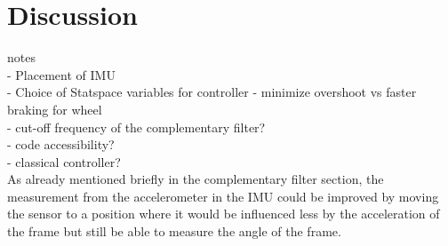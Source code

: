 \chapter{Discussion}

{\Large notes} \\
- Placement of IMU\\
- Choice of Statspace variables for controller - minimize overshoot vs faster braking for wheel\\
- cut-off frequency of the complementary filter?\\
- code accessibility?\\
- classical controller?\\


As already mentioned briefly in the complementary filter section, the measurement from the accelerometer in the IMU could be improved by moving the sensor to a position where it would be influenced less by the acceleration of the frame but still be able to measure the angle of the frame. 

